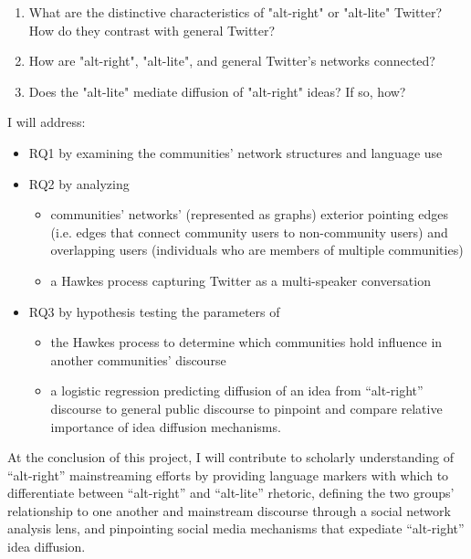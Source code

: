 \documentclass[acmlarge, screen, authorversion]{acmart}
\begin{document}
\begin{enumerate}[font={\bfseries},label={{RQ}\arabic*.}]
	\item What are the distinctive characteristics of "alt-right" or "alt-lite" Twitter? How do they contrast with general Twitter?

	\item How are "alt-right", "alt-lite", and general Twitter's networks connected?

	\item Does the "alt-lite" mediate diffusion of "alt-right" ideas? If so, how?
\end{enumerate}

I will address:
\begin{itemize}
	\item RQ1 by examining the communities’ network structures and language use
	\item RQ2 by analyzing
	      \begin{itemize}
	      	\item communities’ networks’ (represented as graphs) exterior pointing edges
	      	      (i.e. edges that connect community users to non-community users) and
	      	      overlapping users (individuals who are members of multiple communities)
	      	\item a Hawkes process capturing Twitter as a multi-speaker
	      	      conversation
	      \end{itemize}
	\item RQ3 by hypothesis testing the parameters of
	      \begin{itemize}
	      	\item the Hawkes
	      	      process to determine which communities hold influence in another
	      	      communities’ discourse
	      	\item a logistic regression predicting diffusion of an idea from
	      	      ``alt-right” discourse to general public discourse to pinpoint and compare relative importance of idea diffusion mechanisms.
	      \end{itemize}
\end{itemize}

At the conclusion of this project, I will contribute to scholarly understanding of ``alt-right''
mainstreaming efforts by providing language markers with which to differentiate between
``alt-right'' and ``alt-lite'' rhetoric, defining the two groups' relationship to one another and
mainstream discourse through a social network analysis lens, and pinpointing social media mechanisms
that expediate ``alt-right'' idea diffusion.
\end{document}
